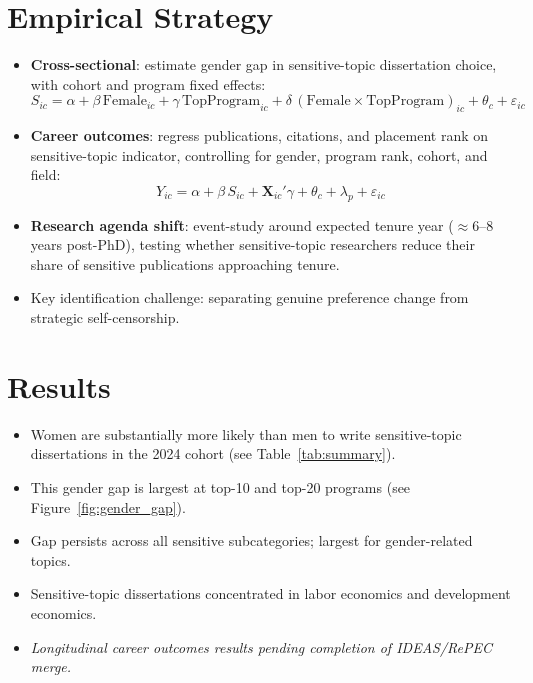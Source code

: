 \documentclass[12pt,a4paper]{article}
\begin{document}
\section{Empirical Strategy}
\label{sec:empirical}
\begin{itemize}
    \item \textbf{Cross-sectional}: estimate gender gap in sensitive-topic dissertation choice, with cohort and program fixed effects:
    \begin{equation}
        S_{ic} = \alpha + \beta\,\text{Female}_{ic} + \gamma\,\text{TopProgram}_{ic} + \delta\,(\text{Female} \times \text{TopProgram})_{ic} + \theta_c + \varepsilon_{ic}
    \end{equation}
    \item \textbf{Career outcomes}: regress publications, citations, and placement rank on sensitive-topic indicator, controlling for gender, program rank, cohort, and field:
    \begin{equation}
        Y_{ic} = \alpha + \beta\, S_{ic} + \mathbf{X}_{ic}'\gamma + \theta_c + \lambda_p + \varepsilon_{ic}
    \end{equation}
    \item \textbf{Research agenda shift}: event-study around expected tenure year ($\approx$6--8 years post-PhD), testing whether sensitive-topic researchers reduce their share of sensitive publications approaching tenure.
    \item Key identification challenge: separating genuine preference change from strategic self-censorship.
\end{itemize}

\section{Results}
\label{sec:results}
\begin{itemize}
    \item Women are substantially more likely than men to write sensitive-topic dissertations in the 2024 cohort (see Table~\ref{tab:summary}).
    \item This gender gap is largest at top-10 and top-20 programs (see Figure~\ref{fig:gender_gap}).
    \item Gap persists across all sensitive subcategories; largest for gender-related topics.
    \item Sensitive-topic dissertations concentrated in labor economics and development economics.
    \item \textit{Longitudinal career outcomes results pending completion of IDEAS/RePEC merge.}
\end{itemize}
\end{document}
